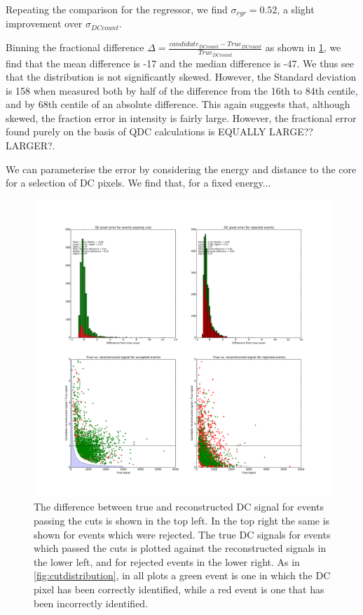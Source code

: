 \documentclass{article}
\begin{document}
Repeating the comparison for the regressor, we find $\sigma_{rgr} = 0.52$, a slight improvement over $\sigma_{DCcount}$.

Binning the fractional difference $\Delta = \frac{ candidate_{DC count} - True_{DC count}}{True_{DC count}}$ as shown in \ref{fig:dcdiff}, we find that the mean difference is -17 and the median difference is -47. We thus see that the distribution is not significantly skewed. However, the Standard deviation is 158 when measured both by half of the difference from the 16th to 84th centile, and by 68th centile of an absolute difference. This again suggests that, although skewed, the fraction error in intensity is fairly large. However, the fractional error found purely on the basis of QDC calculations is EQUALLY LARGE??LARGER?.

We can parameterise the error by considering the energy and distance to the core for a selection of DC pixels. We find that, for a fixed energy...


\begin{figure}
\begin{center}
\includegraphics[width=\textwidth]{DCcounterrorhess1None}
\caption{The difference between true and reconstructed DC signal for events passing the cuts is shown in the top left. In the top right the same is shown for events which were rejected. The true DC signals for events which passed the cuts is plotted against the reconstructed signals in the lower left, and for rejected events in the lower right. As in \ref{fig:cutdistribution}, in all plots a green event is one in which the DC pixel has been correctly identified, while a red event is one that has been incorrectly identified.}
\label{fig:dcdiff}
\end{center}
\end{figure}
\end{document}
